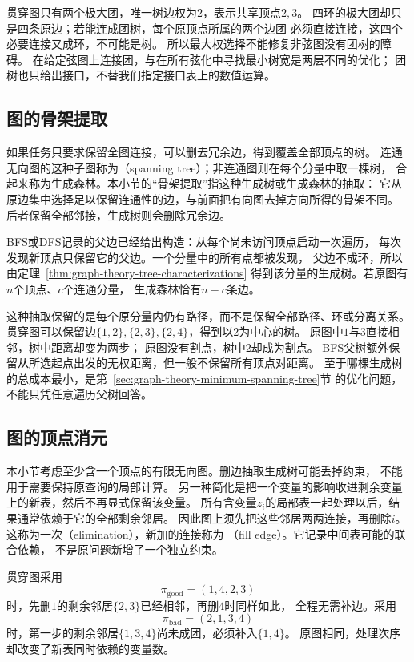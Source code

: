 贯穿图只有两个极大团，唯一树边权为\(2\)，表示共享顶点\(2,3\)。
四环的极大团却只是四条原边；若能连成团树，每个原顶点所属的两个边团
必须直接连接，这四个必要连接又成环，不可能是树。
所以最大权选择不能修复非弦图没有团树的障碍。
在给定弦图上连接团，与在所有弦化中寻找最小树宽是两层不同的优化；
团树也只给出接口，不替我们指定接口表上的数值运算。

\subsection{图的骨架提取}
\label{sec:graph-theory-spanning-skeleton}

如果任务只要求保留全图连接，可以删去冗余边，得到覆盖全部顶点的树。
连通无向图的这种子图称为（spanning tree）；非连通图则在每个分量中取一棵树，
合起来称为生成森林。本小节的“骨架提取”指这种生成树或生成森林的抽取：
它从原边集中选择足以保留连通性的边，与前面把有向图去掉方向所得的骨架不同。
后者保留全部邻接，生成树则会删除冗余边。

BFS或DFS记录的父边已经给出构造：从每个尚未访问顶点启动一次遍历，
每次发现新顶点只保留它的父边。一个分量中的所有点都被发现，
父边不成环，所以由定理~\ref{thm:graph-theory-tree-characterizations}
得到该分量的生成树。若原图有\(n\)个顶点、\(c\)个连通分量，
生成森林恰有\(n-c\)条边。

这种抽取保留的是每个原分量内仍有路径，而不是保留全部路径、环或分离关系。
贯穿图可以保留边\(\{1,2\},\{2,3\},\{2,4\}\)，得到以\(2\)为中心的树。
原图中\(1\)与\(3\)直接相邻，树中距离却变为两步；
原图没有割点，树中\(2\)却成为割点。
BFS父树额外保留从所选起点出发的无权距离，但一般不保留所有顶点对距离。
至于哪棵生成树的总成本最小，是第~\ref{sec:graph-theory-minimum-spanning-tree}节
的优化问题，不能只凭任意遍历父树回答。

\subsection{图的顶点消元}
\label{sec:graph-theory-elimination-width}

本小节考虑至少含一个顶点的有限无向图。删边抽取生成树可能丢掉约束，
不能用于需要保持原查询的局部计算。
另一种简化是把一个变量的影响收进剩余变量上的新表，然后不再显式保留该变量。
所有含变量\(z_i\)的局部表一起处理以后，结果通常依赖于它的全部剩余邻居。
因此图上须先把这些邻居两两连接，再删除\(i\)。
这称为一次（elimination），新加的连接称为
（fill edge）。它记录中间表可能的联合依赖，
不是原问题新增了一个独立约束。

贯穿图采用
\[
  \pi_{\mathrm{good}}=(1,4,2,3)
\]
时，先删\(1\)的剩余邻居\(\{2,3\}\)已经相邻，再删\(4\)时同样如此，
全程无需补边。采用
\[
  \pi_{\mathrm{bad}}=(2,1,3,4)
\]
时，第一步的剩余邻居\(\{1,3,4\}\)尚未成团，必须补入\(\{1,4\}\)。
原图相同，处理次序却改变了新表同时依赖的变量数。

